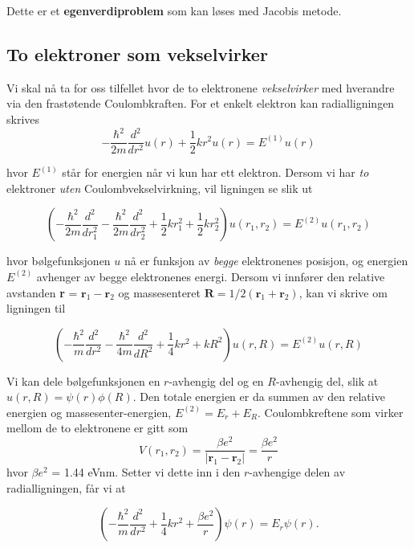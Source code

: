 \documentclass{article}
\begin{document}
Dette er et \textbf{egenverdiproblem} som kan løses med Jacobis metode. 

\subsection{To elektroner som vekselvirker}
Vi skal nå ta for oss tilfellet hvor de to elektronene \textit{vekselvirker} med hverandre via den frastøtende Coulombkraften. For et enkelt elektron kan radialligningen skrives
\begin{equation}
-\frac{\hbar ^2}{2m}\frac{d^2}{dr^2}u(r) + \frac{1}{2}kr^2u(r) = E^{(1)}u(r)
\end{equation}

hvor $E^{(1)}$ står for energien når vi kun har ett elektron. Dersom vi har \textit{to} elektroner \textit{uten} Coulombvekselvirkning, vil ligningen se slik ut

\begin{equation}
\left(  -\frac{\hbar^2}{2 m} \frac{d^2}{dr_1^2} -\frac{\hbar^2}{2 m} \frac{d^2}{dr_2^2}+ \frac{1}{2}k r_1^2+ \frac{1}{2}k r_2^2\right)u(r_1,r_2)  = E^{(2)} u(r_1,r_2)
\end{equation}

hvor bølgefunksjonen $u$ nå er funksjon av \textit{begge} elektronenes posisjon, og energien $E^{(2)}$ avhenger av begge elektronenes energi. Dersom vi innfører den relative avstanden \textbf{r} = $\textbf{r}_1 - \textbf{r}_2$ og massesenteret $\textbf{R} = 1/2(\textbf{r}_1 + \textbf{r}_2)$, kan vi skrive om ligningen til

\begin{equation}
\left(  -\frac{\hbar^2}{m} \frac{d^2}{dr^2} -\frac{\hbar^2}{4 m} \frac{d^2}{dR^2}+ \frac{1}{4} k r^2+  kR^2\right)u(r,R)  = E^{(2)} u(r,R)
\end{equation}

Vi kan dele bølgefunksjonen en $r$-avhengig del og en $R$-avhengig del, slik at $u(r,R) = \psi (r) \phi (R) $. Den totale energien er da summen av den relative energien og massesenter-energien, $E^{(2)} = E_r + E_R$. Coulombkreftene som virker mellom de to elektronene er gitt som
\begin{equation}
V(r_1, r_2) = \frac{\beta e^2}{|\textbf{r}_1 - \textbf{r}_2|} = \frac{\beta e^2}{r}
\end{equation}
hvor $\beta e^2$ = 1.44 eVnm. Setter vi dette inn i den $r$-avhengige delen av radialligningen, får vi at

\begin{equation*}
\left(  -\frac{\hbar^2}{m} \frac{d^2}{dr^2}+ \frac{1}{4}k r^2+\frac{\beta e^2}{r}\right)\psi(r)  = E_r \psi(r).
\end{equation*}
\end{document}
